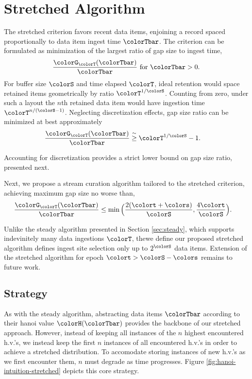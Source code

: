 \section{Stretched Algorithm} \label{sec:stretched}

The stretched criterion favors recent data items, enjoining a record spaced proportionally to data item ingest time $\colorTbar$.
The criterion can be formulated as minimization of the largest ratio of gap size to ingest time,
\begin{align*}
\frac{\colorG_{\colorT}(\colorTbar)}{\colorTbar} \text{ for } \colorTbar > 0.
\end{align*}
For buffer size $\colorS$ and time elapsed $\colorT$, ideal retention would space retained items geometrically by ratio $\colorT^{1/\colorS}$.
Counting from zero, under such a layout the $n$th retained data item would have ingestion time $\colorT^{n/(\colorS - 1)}$.
Neglecting discretization effects, gap size ratio can be minimized at best approximately
\begin{align*}
\frac{\colorG_{\colorT}(\colorTbar)}{\colorTbar}
&\stackrel{\sim}{\geq}
\colorT^{1/\colorS} - 1.
\end{align*}

Accounting for discretization provides a strict lower bound on gap size ratio, presented next.



Next, we propose a stream curation algorithm tailored to the stretched criterion, achieving maximum gap size no worse than,
\begin{align*}
\frac{\colorG_{\colorT}(\colorTbar)}{\colorTbar}
&\leq
\min\Big(
  \frac{2(\colort + \colors)}{\colorS},
  \frac{4\colort}{\colorS}
\Big).
\end{align*}

Unlike the steady algorithm presented in Section \ref{sec:steady}, which supports indevinitely many data ingestions $\colorT$, thewe define our proposed stretched algorithm defines ingest site selection only up to $2^{\colorS}$ data items.
Extension of the stretched algorithm for epoch $\colort > \colorS - \colors$ remains to future work.

\subsection{Strategy}



As with the steady algorithm, abstracting data items $\colorTbar$ according to their hanoi value $\colorH(\colorTbar)$ provides the backbone of our stretched approach.
However, instead of keeping all instances of the $n$ highest encountered h.v.'s, we instead keep the first $n$ instances of all encountered h.v.'s in order to achieve a stretched distribution.
To accomodate storing instances of new h.v.'s as we first encounter them, $n$ must degrade as time progresses.
Figure \ref{fig:hanoi-intuition-stretched} depicts this core strategy.

